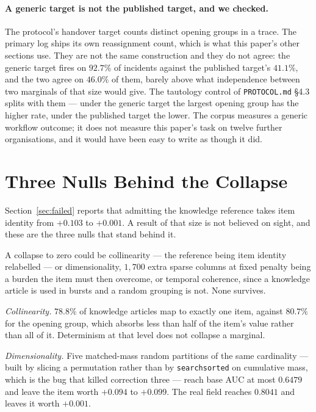 \documentclass[preprint,12pt]{elsarticle}
\begin{document}
\paragraph{A generic target is not the published target, and we checked.}
The protocol's handover target counts distinct opening groups in a trace. The
primary log ships its own reassignment count, which is what this paper's other
sections use. They are not the same construction and they do not agree: the
generic target fires on $92.7\%$ of incidents against the published target's
$41.1\%$, and the two agree on $46.0\%$ of them, barely above what
independence between two marginals of that size would give. The tautology
control of \texttt{PROTOCOL.md} \S4.3 splits with them --- under the generic
target the largest opening group has the higher rate, under the published
target the lower. The corpus measures a generic workflow outcome; it does not
measure this paper's task on twelve further organisations, and it would have
been easy to write as though it did.

\section{Three Nulls Behind the Collapse}
\label{app:nulls}

Section~\ref{sec:failed} reports that admitting the knowledge reference takes item identity from $+0.103$ to $+0.001$. A result of that size is not believed on sight, and these are the three nulls that stand behind it.

A collapse to zero could be collinearity --- the reference being item identity
relabelled --- or dimensionality, $1{,}700$ extra sparse columns at fixed
penalty being a burden the item must then overcome, or temporal coherence,
since a knowledge article is used in bursts and a random grouping is not. None
survives.

\emph{Collinearity.} $78.8\%$ of knowledge articles map to exactly one item,
against $80.7\%$ for the opening group, which absorbs less than half of the
item's value rather than all of it. Determinism at that level does not
collapse a marginal.

\emph{Dimensionality.} Five matched-mass random partitions of the same
cardinality --- built by slicing a permutation rather than by
\texttt{searchsorted} on cumulative mass, which is the bug that killed
correction three --- reach base AUC at most $0.6479$ and leave the item worth
$+0.094$ to $+0.099$. The real field reaches $0.8041$ and leaves it worth
$+0.001$.
\end{document}
